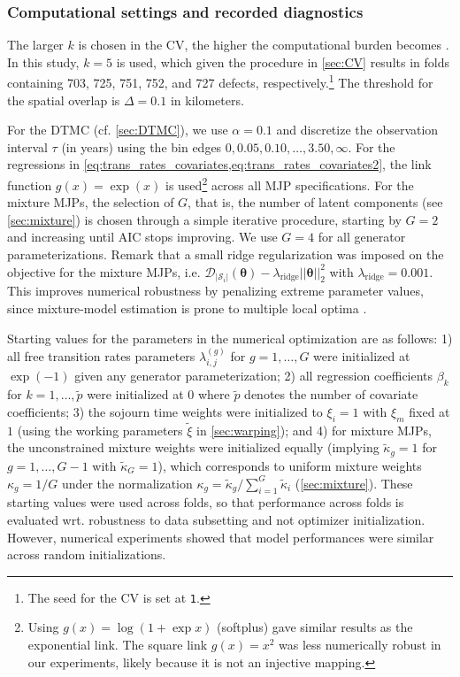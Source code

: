 \documentclass{article}
\begin{document}
\subsubsection{Computational settings and recorded diagnostics} \label{sec:CV_details}
The larger $k$ is chosen in the CV, the higher the computational burden becomes \citep{fushiki2011a}. In this study, $k=5$ is used, which given the procedure in \cref{sec:CV} results in folds containing \num{703}, \num{725}, \num{751}, \num{752}, and \num{727} defects, respectively.\footnote{The seed for the CV is set at \texttt{1}.} The threshold for the spatial overlap is $\Delta = 0.1$ in kilometers.

For the DTMC (cf. \cref{sec:DTMC}), we use $\alpha=0.1$ and discretize the observation interval $\tau$ (in years) using the bin edges
$
0,0.05,0.10,\dots,3.50,\infty
$.
For the regressions in \cref{eq:trans_rates_covariates,eq:trans_rates_covariates2}, the link function $g(x) = \exp(x)$ is used\footnote{Using $g(x)=\log(1+\exp x)$ (softplus) gave similar results as the exponential link. The square link $g(x)=x^2$ was less numerically robust in our experiments, likely because it is not an injective mapping.} across all MJP specifications.
For the mixture MJPs, the selection of $G$, that is, the number of latent components (see \cref{sec:mixture}) is chosen through a simple iterative procedure, starting by $G=2$ and increasing until AIC stops improving. We use $G = 4$ for all generator parameterizations. Remark that a small ridge regularization was imposed on the objective for the mixture MJPs, i.e. $\mathcal D_{|\mathcal S_i|} (\bm \theta) - \lambda_{\text{ridge}} ||\bm \theta||_{2}^2$ with $\lambda_{\text{ridge}} = 0.001$.  This improves numerical robustness by penalizing extreme parameter values, since mixture-model estimation is prone to multiple local optima \citep{shireman2016a}.

Starting values for the parameters in the numerical optimization are as follows: 1) all free transition rates parameters $\lambda_{i,j}^{(g)}$ for $g = 1,\dots,G$ were initialized at $\exp(-1)$ given any generator parameterization; 2) all regression coefficients $ \beta_k$ for $ k = 1,\dots, \widetilde{p}$ were initialized at $0$ where $\widetilde{p}$ denotes the number of covariate coefficients; 3) the sojourn time weights were initialized to $\xi_i=1$ with $\xi_m$ fixed at $1$ (using the working parameters $\widetilde \xi$ in \cref{sec:warping}); and 4) for mixture MJPs, the unconstrained mixture weights were initialized equally (implying $\tilde\kappa_g = 1$ for $g=1,\dots,G-1$ with $\tilde\kappa_G=1$), which corresponds to uniform mixture weights $\kappa_g = 1/G$ under the normalization $\kappa_g=\tilde\kappa_g/\sum_{i=1}^G \tilde\kappa_i $ (\cref{sec:mixture}).  
These starting values were used across folds, so that performance across folds is evaluated wrt. robustness to data subsetting and not optimizer initialization. However, numerical experiments showed that model performances were similar across random initializations.
\end{document}
